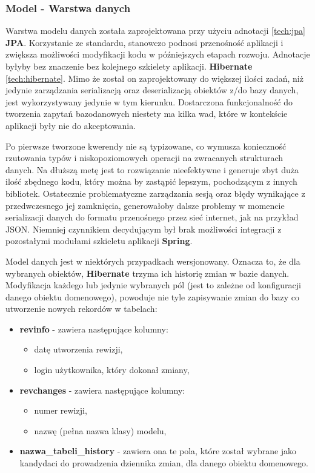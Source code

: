\subsubsection{Model - Warstwa danych}
	Warstwa modelu danych została zaprojektowana przy użyciu adnotacji \ref{tech:jpa} \textbf{JPA}. Korzystanie ze standardu, stanowczo podnosi przenośność aplikacji i zwiększa możliwości modyfikacji kodu w późniejszych etapach rozwoju. Adnotacje byłyby bez znaczenie bez kolejnego szkielety aplikacji. \textbf{Hibernate} \ref{tech:hibernate}. Mimo że został on zaprojektowany do większej ilości zadań, niż jedynie zarządzania serializacją oraz deserializacją obiektów z/do bazy danych, jest wykorzystywany jedynie w tym kierunku. Dostarczona funkcjonalność do tworzenia zapytań bazodanowych niestety ma kilka wad, które w kontekście aplikacji były nie do akceptowania.
	
	Po pierwsze tworzone kwerendy nie są typizowane, co wymusza konieczność rzutowania typów i niskopoziomowych operacji na zwracanych strukturach danych. Na dłuższą metę jest to rozwiązanie nieefektywne i generuje zbyt duża ilość zbędnego kodu, który można by zastąpić lepszym, pochodzącym z innych bibliotek. Ostatecznie problematyczne zarządzania sesją oraz błędy wynikające z przedwczesnego jej zamknięcia, generowałoby dalsze problemy w momencie serializacji danych do formatu przenośnego przez sieć internet, jak na przykład JSON. Niemniej czynnikiem decydującym był brak możliwości integracji z pozostałymi modułami szkieletu aplikacji \textbf{Spring}.
		
	Model danych jest w niektórych przypadkach wersjonowany. Oznacza to, że dla wybranych obiektów, \textbf{Hibernate} trzyma ich historię zmian
	w bazie danych. Modyfikacja każdego lub jedynie wybranych pól (jest to zależne od konfiguracji danego obiektu domenowego), powoduje nie tyle
	zapisywanie zmian do bazy co utworzenie nowych rekordów w tabelach:
	\begin{itemize}
		\item \textbf{revinfo} - zawiera następujące kolumny:
		\begin{itemize}
			\item datę utworzenia rewizji,
			\item login użytkownika, który dokonał zmiany,
		\end{itemize} 
		\item \textbf{revchanges} - zawiera następujące kolumny:
		\begin{itemize}e
			\item numer rewizji,
			\item nazwę (pełna nazwa klasy) modelu,
		\end{itemize}
		\item \textbf{nazwa\_tabeli\_history} - zawiera ona te pola, które został wybrane jako kandydaci do prowadzenia 
		dziennika zmian, dla danego obiektu domenowego.
	\end{itemize}
	
